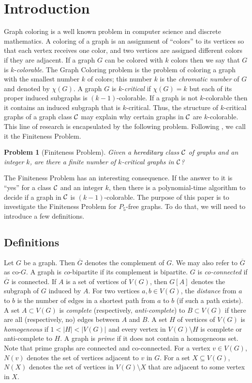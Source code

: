 \documentclass[a4paper,11pt]{article}
\newtheorem{problem}[theorem]{Problem}
\theoremstyle{case}
\newcommand{\thecolor}{black}
\begin{document}
\section{Introduction}\label{sec:intro}
Graph coloring is a well known problem in computer science and
discrete mathematics. A coloring of a graph is an assignment of ``colors'' to its vertices so that each vertex receives one color, and two vertices are assigned different colors if they are adjacent.  If a graph $G$ can be colored with $k$ colors then we say that $G$ is $k$-{\it colorable}. The Graph Coloring problem is the problem of coloring a graph with the smallest number $k$ of colors; this number $k$ is the {\it chromatic number} of $G$ and denoted by $\chi(G)$.
A graph $G$ is $k$-{\it critical} if $\chi(G) = k$ but each of its proper induced subgraphs is $(k - 1)$-colorable. If a graph is not $k$-colorable then it contains an induced subgraph that is $k$-critical. Thus, the structure of $k$-critical graphs of a graph class ${\cal C}$ may explain why certain graphs in ${\cal C}$ are $k$-colorable. This line of research is encapsulated by the following problem. Following \cite{HuaLi2023}, we call it the Finiteness Problem.
\begin{problem}[Finiteness Problem]
    Given a \textcolor{\thecolor}{hereditary} class ${\cal C}$ of graphs and an integer $k$, are there a finite number of $k$-critical graphs in ${\cal C}$?
\end{problem}
The Finiteness Problem has an interesting consequence. If the answer to it is ``yes'' for a class ${\cal C}$ and an integer $k$, then there is a polynomial-time algorithm to decide if a graph in ${\cal C}$ is $(k-1)$-colorable. The purpose of this paper is to investigate the Finiteness Problem for $P_5$-free graphs. To do that, we will need to introduce a few definitions. 

\subsection{Definitions}
Let $G$ be a graph. Then $\overline{G}$ denotes the complement of $G$. We may also refer to $\overline{G}$ as co-$G$. A graph is {\it co}-bipartite if its complement is bipartite. $G$ is {\it co-connected} if $\overline{G}$ is connected.  If $A$ is a set of vertices of $V(G)$, then $G[A]$ denotes the subgraph of $G$ induced by $A$. For two vertices $a,b \in V(G)$, the {\it distance} from $a$ to $b$ is the number of edges in a shortest path from $a$ to $b$ (if such a path exists). A set $A \subset V(G)$ is {\it complete} (respectively, {\it anti-complete}) to $B \subset V(G)$ if there are all (respectively, no) edges between $A$ and $B$. A set $H$ of vertices of $V(G)$ is {\it homogeneous} if $1 < |H| <|V(G)|$ and every vertex in $V(G) \setminus H$ is complete or anti-complete to $H$.  A graph is {\it prime} if it does not contain a homogeneous set. Note that prime graphs are connected and co-connected. For a vertex $v \in V(G)$, $N(v)$ denotes the set of vertices adjacent to $v$ in $G$. For a set $X \subseteq V(G)$, $N(X)$ denotes the set of vertices in $V(G) \setminus X$ that are adjacent to some vertex in $X$.
\end{document}
